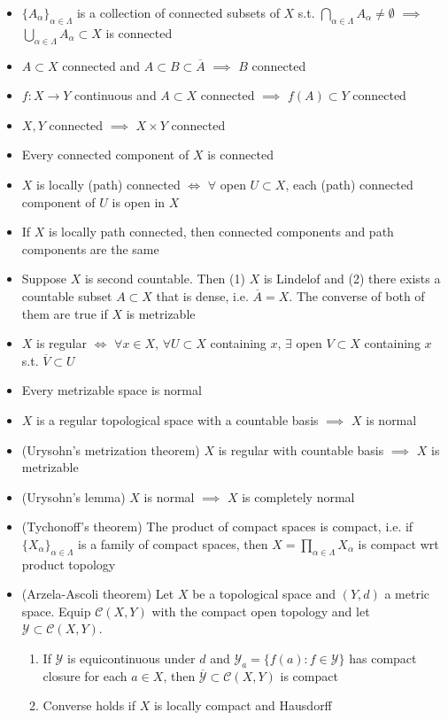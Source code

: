 \documentclass[frenchspacing,9pt,landscape,a4paper]{article}
\theoremstyle{remark}
\begin{document}
\begin{multicols}{4}
\begin{itemize}
\item $\{A_\alpha\}_{\alpha\in\Lambda}$ is a collection of connected subsets of  $X$ s.t.
    $\bigcap_{\alpha\in\Lambda}A_\alpha\neq\emptyset$  $\implies$  $\bigcup_{\alpha\in\Lambda}A_\alpha\subset X$ is
    connected
\item $A\subset X$ connected and  $A\subset B\subset\overline{A}$  $\implies$  $B$ connected
\item $f:X\to Y$ continuous and  $A\subset X$ connected  $\implies$  $f(A)\subset Y$ connected
\item $X,Y$ connected  $\implies$  $X\times Y$ connected    
\item Every connected component of $X$ is connected
\item $X$ is locally (path) connected  $\iff$  $\forall$ open  $U\subset X$, each (path) connected
    component of  $U$ is open in  $X$    
\item If $X$ is locally path connected, then connected components and path components are the same    
\item Suppose $X$ is second countable. Then (1)  $X$ is Lindelof and (2) there exists a countable subset
    $A\subset X$ that is dense, i.e.  $\overline{A}=X$. The converse of both of them are true if  $X$ is
    metrizable   
\item $X$ is regular  $\iff$  $\forall x\in X$,  $\forall U\subset X$ containing  $x$,  $\exists$ open
    $V\subset X$ containing  $x$ s.t.  $\overline{V}\subset U$   
\item Every metrizable space is normal
\item $X$ is a regular topological space with a countable basis $\implies$  $X$ is normal    
\item (Urysohn's metrization theorem) $X$ is regular with countable basis  $\implies$ $X$ is metrizable    
\item (Urysohn's lemma) $X$ is normal  $\implies$  $X$ is completely normal
\item (Tychonoff's theorem) The product of compact spaces is compact, i.e. if
    $\{X_\alpha\}_{\alpha\in\Lambda}$ is a family of compact spaces, then
    $X=\prod_{\alpha\in\Lambda}X_\alpha$ is compact wrt product topology
\item (Arzela-Ascoli theorem) Let $X$ be a topological space and $(Y,d)$ a metric space. Equip
    $\mathcal{C}(X,Y)$ with the compact open topology and let  $\mathcal{Y}\subset\mathcal{C}(X,Y)$.
    \begin{enumerate}
        \item If $\mathcal{Y}$ is equicontinuous under  $d$ and  $\mathcal{Y}_a=\{f(a):f\in\mathcal{Y}\}$
            has compact closure for each  $a\in X$, then  $\overline{\mathcal{Y}}\subset\mathcal{C}(X,Y)$
            is compact
        \item Converse holds if  $X$ is locally compact and Hausdorff
    \end{enumerate}
\end{itemize}


\end{multicols}
\end{document}

